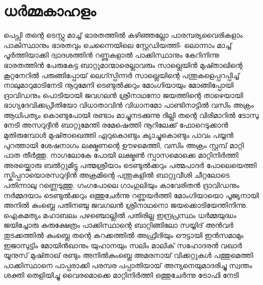 \chapter{ധർമ്മകാഹളം}
\obeylines
\noindent
പെപ്സി തന്റെ ടെസ്റ്റു മാച്ച്
ഭാരതത്തിൽ കഴിഞ്ഞല്ലോ
പാരമ്പര്യവൈരികളാം 
പാകിസ്ഥാനും ഭാരതവും
ചെന്നൈയിലെ സ്റ്റേഡിയത്തി-
ലൊന്നാം മാച്ച് പൂർത്തിയാക്കി
ദ്വാദശത്തിൻ റണ്ണുകളാൽ
പാക്കിസ്ഥാനും കേറിനിന്നു
ഭാരതത്തിൻ പേരുകേട്ട
ബാറ്റുമാന്മാരെല്ലാവരും
സാഖ്ലെയിൻ മുഷ്താഖിന്റെ
കൂറ്റനേറിൽ പരുങ്ങിപ്പോയ്
ലെഗ്സ്പിന്നർ സാഖ്ലെയിന്റെ
പന്തുകളെപ്പറപ്പിച്ച്
നാലുമാറുമാടിനേടി
നൂറുമേനി ടെണ്ടുൽക്കറും
മോംഗിയായും മോങ്ങിപ്പോയി
ദ്രാവിഡനും പൊടിയായി
ജവഗലൻ ശ്രീനാഥനോ
ജയത്തിന്റെ താഴെയായി
ഭാഗ്യദേവിക്കപ്രീതിയോ
വിധാതാവിൻ വിധാനമോ
പാണ്ടിനാട്ടിൽ വസിം അക്രം
ആധിപത്യം കൊണ്ടുപോയി
രണ്ടാം മാച്ചുനടക്കുന്നു
ദില്ലി തന്റെ വിരിമാറിൽ
ടോസു നേടി അസറുദ്ദീൻ
ബാറ്റുമേന്തി രമേഷെത്തി
നൂറിലേക്ക് ഫോറെടുക്കാൻ
മുതിരുമ്പോൾ മുഷ്താഖെത്തി
ഏറുകൊണ്ടും ക്യാച്ചുകൊണ്ടും
പാവം പയ്യൻ പുറത്തായി
ശേഷനാഗം ലക്ഷ്മണന്റെ
ഊഴമെത്തി, വസിം അക്രം
സ്റ്റമ്പ് മാറ്റി പാത തീർത്തു.
നാഗലോകേ പോയി ലക്ഷ്മൺ
സ്പാസമൊക്കെ മാറ്റിനിർത്തി 
അരയ്ക്കൊരു ബൽറ്റുമിട്ടു
പത്മശ്രീയാം ടെണ്ടുൽക്കറും
പത്മപാദർ പോലെയെത്തി
സ്കിപ്പറായൊരസറുദ്ദിൻ
അക്രമിന്റെ പന്തുകളിൽ
ബാറ്റുവീശി ചീറ്റലോടെ
പതിന്നാലു റണ്ണെടുത്തു.
ഗംഗപോലെ ഗാംഗുലിയും
കാവേരിതൻ ദ്രാവിഡനും
നർമ്മദയാം ടെണ്ടുൽക്കറും
ഒത്തുചേർന്നു റണ്ണുയർത്തി
മോംഗിയായൊ പൂജ്യനായി
അനിൽ കുംബ്ലെ പതിനഞ്ചു
ജവഗലൻ ശ്രീനാഥനൊ
ജയക്കൊടിയേന്തിനിന്നു.
ഐകമത്യം മഹാബലം
പഴഞ്ചൊല്ലിൽ പതിരില്ല
ഇന്ദ്രപ്രസ്ഥം ധർമ്മയുദ്ധം
ജയിച്ചോരു കുരുക്ഷേത്രം
പാക്കിസ്ഥാന്റെ ബാറ്റിങ്ങിലോ 
സയ്യിദ് അൻവർ തുടക്കത്തിൽ
കുംബ്ലെ തന്റെ കറക്കത്തിൽ
അഫ്രീദിയും ഔട്ടായി
ഇൻസമാമും ഇജാസുട്ടിം
മോയിൻഖാനും യുഹാനയും
സലിം മാലിക് സഹോദരൻ
വഖാർ യൂനുസ് മുഷ്താഖ് രണ്ടും
അനിൽകുംബ്ലെ അമരനായ്
വിക്കറ്റുകൾ പത്തുമെത്തി
പാക്കിസ്ഥാനെ പാപ്പരാക്കി
പരമ്പര പപ്പാതിയായ്
അന്യനെയുമാദരിച്ചു
സ്വന്തം ശക്തി തെളിയിച്ചു
വൈരമൊക്കെ മാറ്റിനിർത്തി
ഒത്തുചേർന്നു ട്രോഫി നേടി
